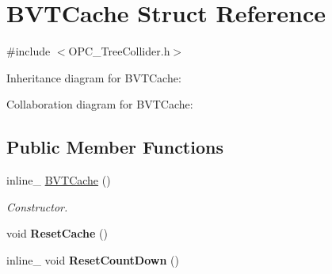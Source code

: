 \hypertarget{struct_b_v_t_cache}{\section{B\+V\+T\+Cache Struct Reference}
\label{struct_b_v_t_cache}
}


{\ttfamily \#include $<$O\+P\+C\+\_\+\+Tree\+Collider.\+h$>$}



Inheritance diagram for B\+V\+T\+Cache\+:


Collaboration diagram for B\+V\+T\+Cache\+:
\subsection*{Public Member Functions}
\begin{DoxyCompactItemize}
\item 
\hypertarget{struct_b_v_t_cache_aaa31dbff32f6e91263f9615082620276}{inline\+\_\+ \hyperlink{struct_b_v_t_cache_aaa31dbff32f6e91263f9615082620276}{B\+V\+T\+Cache} ()}\label{struct_b_v_t_cache_aaa31dbff32f6e91263f9615082620276}

\begin{DoxyCompactList}\small\item\em Constructor. \end{DoxyCompactList}\item 
\hypertarget{struct_b_v_t_cache_aacca357b3b467e10268de85690bd7469}{void {\bfseries Reset\+Cache} ()}\label{struct_b_v_t_cache_aacca357b3b467e10268de85690bd7469}

\item 
\hypertarget{struct_b_v_t_cache_a284f4387f08079c9db2dd8dd7e1cb104}{inline\+\_\+ void {\bfseries Reset\+Count\+Down} ()}\label{struct_b_v_t_cache_a284f4387f08079c9db2dd8dd7e1cb104}

\end{DoxyCompactItemize}
